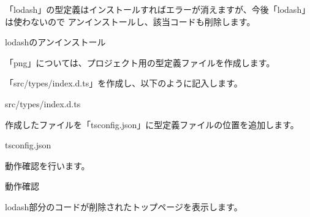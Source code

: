 \clearpage


「lodash」の型定義はインストールすればエラーが消えますが、今後「lodash」は使わないので
アンインストールし、該当コードも削除します。

\def\startercodeblockfontsize{}
\begin{starterterminal}[]{lodashのアンインストール}\end{starterterminal}

「png」については、プロジェクト用の型定義ファイルを作成します。

\vspace*{\baselineskip}

「src/types/index.d.ts」を作成し、以下のように記入します。

\def\startercodeblockfontsize{}
\begin{starterprogram}[]{src/types/index.d.ts}\end{starterprogram}

作成したファイルを「tsconfig.json」に型定義ファイルの位置を追加します。

\def\startercodeblockfontsize{}
\begin{starterprogram}[]{tsconfig.json}\end{starterprogram}

動作確認を行います。

\def\startercodeblockfontsize{}
\begin{starterterminal}[]{動作確認}\end{starterterminal}

lodash部分のコードが削除されたトップページを表示します。

